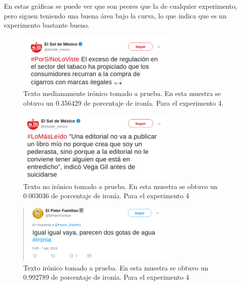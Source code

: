 \par En estas gráficas se puede ver que son peores que la de cualquier experimento, pero siguen teniendo una buena área bajo la curva, lo que indica que es un experimento bastante bueno.

\begin{figure}
	\centering
	\includegraphics[width=0.7\textwidth]{imagenes/ironia3.png}
	\caption{Texto medianamente irónico tomado a prueba. En esta muestra se obtuvo un 0.356429 de porcentaje de ironía. Para el experimento 4.} %
	\label{fig:ironyTest3}
\end{figure}

\begin{figure}
	\centering
	\includegraphics[width=0.7\textwidth]{imagenes/ironia4.png}
	\caption{Texto no irónico tomado a prueba. En esta muestra se obtuvo un 0.003036 de porcentaje de ironía. Para el experimento 4} %
	\label{fig:ironyTest4}
\end{figure}

\begin{figure}
	\centering
	\includegraphics[width=0.7\textwidth]{imagenes/ironia1.png}
	\caption{Texto irónico tomado a prueba. En esta muestra se obtuvo un 0.992789 de porcentaje de ironía. Para el experimento 4} %
	\label{fig:ironyTest5}
\end{figure}

